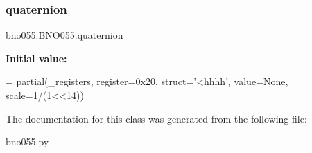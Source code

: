 \subsubsection{\texorpdfstring{quaternion}{quaternion}}
{\footnotesize\ttfamily bno055.\+B\+N\+O055.\+quaternion\hspace{0.3cm}{\ttfamily [static]}}

{\bfseries Initial value\+:}
\begin{DoxyCode}
=  partial(\_registers, register=0x20, struct=\textcolor{stringliteral}{'<hhhh'},
                         value=\textcolor{keywordtype}{None}, scale=1/(1<<14))
\end{DoxyCode}


The documentation for this class was generated from the following file\+:\begin{DoxyCompactItemize}
\item 
bno055.\+py\end{DoxyCompactItemize}
